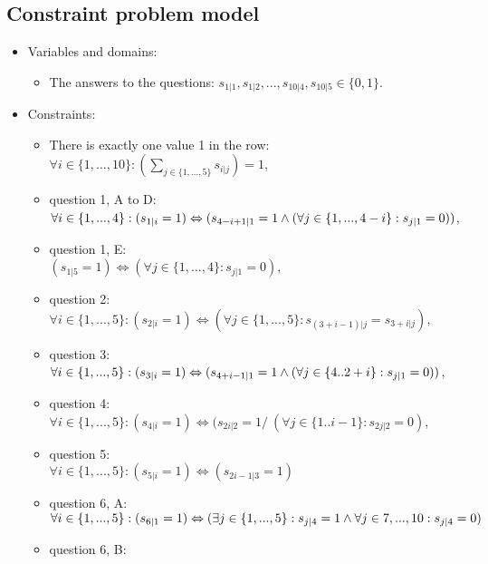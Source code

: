 \subsection{Constraint problem model}
	\begin{itemize}
  \item Variables and domains: 
    \begin{itemize}
      \item The answers to the questions: $s_{1|1}, s_{1|2}, ..., s_{10|4}, s_{10|5} \in \{0, 1\}$.
    \end{itemize}
	\item Constraints:
	 \begin{itemize}
    \item There is exactly one value 1 in the row: \\
      $\forall i \in \{1, \ldots, 10\}: \left(\sum_{j \in \{1, ..., 5\}}{s_{i|j}}\right) = 1$,
    \item question 1, A to D: \\
      $\forall i \in \{1,...,4\}: (s_{1|i} = 1) \Leftrightarrow (s_{4-i+1|1} = 1 \wedge (\forall j \in \{1,...,4-i\}: s_{j|1} = 0))$,
    \item question 1, E: \\
      $(s_{1|5} = 1) \Leftrightarrow (\forall j \in \{1,...,4\}: s_{j|1} = 0)$,
    \item question 2: \\
      $\forall i \in \{1,...,5\}: (s_{2|i} = 1) \Leftrightarrow (\forall j \in \{1,...,5\}: s_{(3+i-1)|j} = s_{3+i|j})$,
    \item question 3: \\
      $\forall i \in \{1,...,5\}: (s_{3|i} = 1) \Leftrightarrow (s_{4+i-1|1} = 1 \wedge (\forall j \in \{4..2+i\}: s_{j|1} = 0 ) )$,
    \item question 4: \\
      $\forall i \in \{1,...,5\}: (s_{4|i} = 1) \Leftrightarrow (s_{2i|2} = 1 /\ ( \forall j \in \{1..i-1\}: s_{2j|2} = 0 )$,
    \item question 5: \\
      $\forall i \in \{1,...,5\}: (s_{5|i} = 1) \Leftrightarrow (s_{2i-1|3}=1)$
    \item question 6, A: \\
      $\forall i \in \{1,...,5\}: (s_{6|1} = 1) \Leftrightarrow (\exists j \in \{1,...,5\}: s_{j|4} = 1 \wedge \forall j \in {7,...,10}: s_{j|4} = 0)$
    \item question 6, B: \\

\end{itemize}
\end{itemize}

